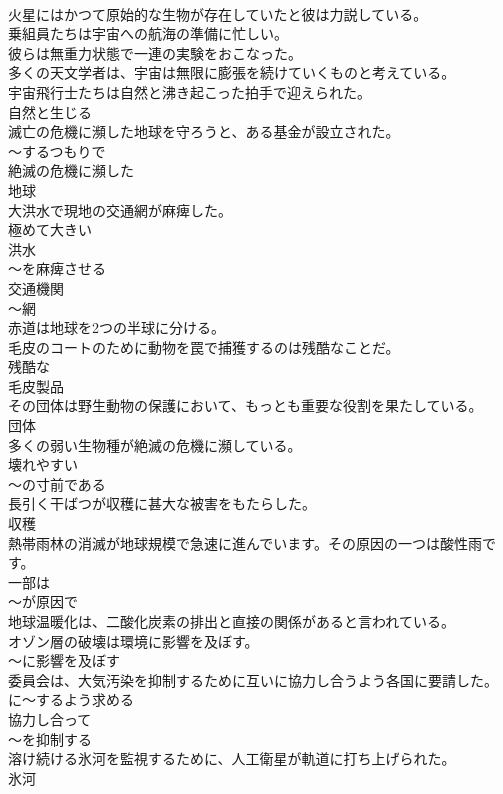 \documentclass[8pt]{extreport}
\begin{document}
\begin{CJK}{UTF8}{min}
\\	火星にはかつて原始的な生物が存在していたと彼は力説している。	
\\	乗組員たちは宇宙への航海の準備に忙しい。	
\\	彼らは無重力状態で一連の実験をおこなった。	
\\	多くの天文学者は、宇宙は無限に膨張を続けていくものと考えている。	
\\	宇宙飛行士たちは自然と沸き起こった拍手で迎えられた。	
\\	自然と生じる
\\	滅亡の危機に瀕した地球を守ろうと、ある基金が設立された。	
\\	～するつもりで 
\\	絶滅の危機に瀕した 
\\	地球
\\	大洪水で現地の交通網が麻痺した。	
\\	極めて大きい 
\\	洪水 
\\	～を麻痺させる 
\\	交通機関 
\\	～網
\\	赤道は地球を2つの半球に分ける。	
\\	毛皮のコートのために動物を罠で捕獲するのは残酷なことだ。	
\\	残酷な 
\\	毛皮製品
\\	その団体は野生動物の保護において、もっとも重要な役割を果たしている。	
\\	団体
\\	多くの弱い生物種が絶滅の危機に瀕している。	
\\	壊れやすい 
\\	～の寸前である
\\	長引く干ばつが収穫に甚大な被害をもたらした。	
\\	収穫
\\	熱帯雨林の消滅が地球規模で急速に進んでいます。その原因の一つは酸性雨です。	
\\	一部は 
\\	～が原因で
\\	地球温暖化は、二酸化炭素の排出と直接の関係があると言われている。	
\\	オゾン層の破壊は環境に影響を及ぼす。	
\\	～に影響を及ぼす
\\	委員会は、大気汚染を抑制するために互いに協力し合うよう各国に要請した。	
\\	に～するよう求める 
\\	協力し合って 
\\	～を抑制する
\\	溶け続ける氷河を監視するために、人工衛星が軌道に打ち上げられた。	
\\	氷河
\end{CJK}
\end{document}
